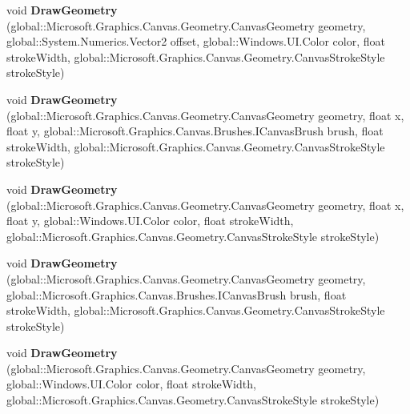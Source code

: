 \begin{DoxyCompactItemize}
void {\bfseries Draw\+Geometry} (global\+::\+Microsoft.\+Graphics.\+Canvas.\+Geometry.\+Canvas\+Geometry geometry, global\+::\+System.\+Numerics.\+Vector2 offset, global\+::\+Windows.\+U\+I.\+Color color, float stroke\+Width, global\+::\+Microsoft.\+Graphics.\+Canvas.\+Geometry.\+Canvas\+Stroke\+Style stroke\+Style)
\item 
\mbox{\label{interface_microsoft_1_1_graphics_1_1_canvas_1_1_i_canvas_drawing_session_a2d6f496d3fb2a489d20c6106ae84ed80}} 
void {\bfseries Draw\+Geometry} (global\+::\+Microsoft.\+Graphics.\+Canvas.\+Geometry.\+Canvas\+Geometry geometry, float x, float y, global\+::\+Microsoft.\+Graphics.\+Canvas.\+Brushes.\+I\+Canvas\+Brush brush, float stroke\+Width, global\+::\+Microsoft.\+Graphics.\+Canvas.\+Geometry.\+Canvas\+Stroke\+Style stroke\+Style)
\item 
\mbox{\label{interface_microsoft_1_1_graphics_1_1_canvas_1_1_i_canvas_drawing_session_aed38218a3653ea2b24aec25fb513c08d}} 
void {\bfseries Draw\+Geometry} (global\+::\+Microsoft.\+Graphics.\+Canvas.\+Geometry.\+Canvas\+Geometry geometry, float x, float y, global\+::\+Windows.\+U\+I.\+Color color, float stroke\+Width, global\+::\+Microsoft.\+Graphics.\+Canvas.\+Geometry.\+Canvas\+Stroke\+Style stroke\+Style)
\item 
\mbox{\label{interface_microsoft_1_1_graphics_1_1_canvas_1_1_i_canvas_drawing_session_a94bae7d96a11bff1dc144fcec27ff249}} 
void {\bfseries Draw\+Geometry} (global\+::\+Microsoft.\+Graphics.\+Canvas.\+Geometry.\+Canvas\+Geometry geometry, global\+::\+Microsoft.\+Graphics.\+Canvas.\+Brushes.\+I\+Canvas\+Brush brush, float stroke\+Width, global\+::\+Microsoft.\+Graphics.\+Canvas.\+Geometry.\+Canvas\+Stroke\+Style stroke\+Style)
\item 
\mbox{\label{interface_microsoft_1_1_graphics_1_1_canvas_1_1_i_canvas_drawing_session_ad5502f42dbe1b86dcf7d7fa937541acb}} 
void {\bfseries Draw\+Geometry} (global\+::\+Microsoft.\+Graphics.\+Canvas.\+Geometry.\+Canvas\+Geometry geometry, global\+::\+Windows.\+U\+I.\+Color color, float stroke\+Width, global\+::\+Microsoft.\+Graphics.\+Canvas.\+Geometry.\+Canvas\+Stroke\+Style stroke\+Style)

\end{DoxyCompactItemize}
